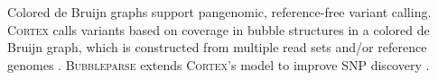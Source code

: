 
Colored de Bruijn graphs support pangenomic, reference-free variant calling.
\textsc{Cortex} calls variants based on coverage in bubble structures in a colored de Bruijn graph, which is constructed from multiple read sets and/or reference genomes \cite{Iqbal_2012}.
\textsc{Bubbleparse} extends \textsc{Cortex}'s model to improve SNP discovery \cite{Leggett_2013}.


%

